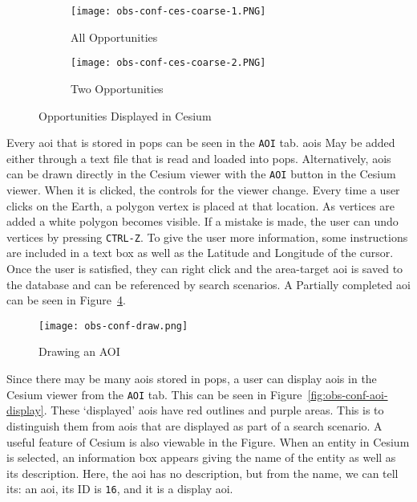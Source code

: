 \begin{figure}[h]
    \centering
    \begin{subfigure}[b]{0.49\textwidth}
	\texttt{[image: obs-conf-ces-coarse-1.PNG]} 
	\caption{All Opportunities}
	\label{fig:obs-conf-ci-1} 
    \end{subfigure}
    \hfill
    \begin{subfigure}[b]{0.49\textwidth}
	\texttt{[image: obs-conf-ces-coarse-2.PNG]} 
	\caption{Two Opportunities}
	\label{fig:obs-conf-ci-2} 
    \end{subfigure}
    \caption{Opportunities Displayed in Cesium}
    \label{fig:obs-conf-ci} 
\end{figure}

Every \gls{aoi} that is stored in \gls{pops} can be seen in the \texttt{AOI}
tab. \glspl{aoi} May be added either through a text file that is read and
loaded into \gls{pops}. Alternatively, \glspl{aoi} can be drawn directly in the
Cesium viewer with the \texttt{AOI} button in the Cesium viewer. When it is
clicked, the controls for the viewer change. Every time a user clicks on the
Earth, a polygon vertex is placed at that location. As vertices are added a
white polygon becomes visible. If a mistake is made, the user can undo vertices
by pressing \texttt{CTRL-Z}. To give the user more information, some
instructions are included in a text box as well as the Latitude and Longitude
of the cursor.  Once the user is satisfied, they can right click and the
area-target \gls{aoi} is saved to the database and can be referenced by search
scenarios. A Partially completed \gls{aoi} can be seen in
Figure~\ref{fig:obs-conf-draw}. 

\begin{figure}
    \centering
    \texttt{[image: obs-conf-draw.png]} 
    \caption{Drawing an AOI}
    \label{fig:obs-conf-draw} 
\end{figure}

Since there may be many \glspl{aoi} stored in \gls{pops}, a user can display
\glspl{aoi} in the Cesium viewer from the \texttt{AOI} tab. This can be seen in
Figure~\ref{fig:obs-conf-aoi-display}. These `displayed' \glspl{aoi} have red
outlines and purple areas. This is to distinguish them from \glspl{aoi} that
are displayed as part of a search scenario. A useful feature of Cesium is also
viewable in the Figure. When an entity in Cesium is selected, an information
box appears giving the name of the entity as well as its description. Here, the
\gls{aoi} has no description, but from the name, we can tell its: an \gls{aoi},
its ID is \texttt{16}, and it is a display \gls{aoi}.


